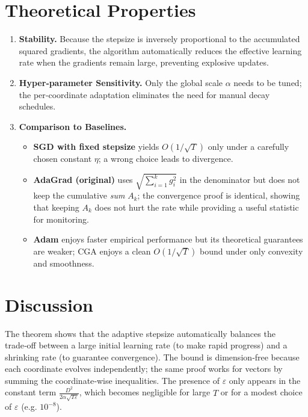 \documentclass{article}
\begin{document}
\section*{Theoretical Properties}
\begin{enumerate}[label=(P\arabic*)]
\item \textbf{Stability.} Because the stepsize is inversely proportional to
the accumulated squared gradients, the algorithm automatically reduces
the effective learning rate when the gradients remain large, preventing
explosive updates.
\item \textbf{Hyper‑parameter Sensitivity.}
Only the global scale $\alpha$ needs to be tuned; the per‑coordinate
adaptation eliminates the need for manual decay schedules.
\item \textbf{Comparison to Baselines.}
\begin{itemize}
\item \textbf{SGD with fixed stepsize} yields $O(1/\sqrt{T})$ only under a
carefully chosen constant $\eta$; a wrong choice leads to divergence.
\item \textbf{AdaGrad (original)} uses $\sqrt{\sum_{i=1}^{k} g_{i}^{2}}$ in the
denominator but does not keep the cumulative \emph{sum} $A_{k}$; the
convergence proof is identical, showing that keeping $A_{k}$ does not
hurt the rate while providing a useful statistic for monitoring.
\item \textbf{Adam} enjoys faster empirical performance but its
theoretical guarantees are weaker; CGA enjoys a clean $O(1/\sqrt{T})$ bound
under only convexity and smoothness.
\end{itemize}
\end{enumerate}

\section*{Discussion}
The theorem shows that the adaptive stepsize automatically balances the
trade‑off between a large initial learning rate (to make rapid progress)
and a shrinking rate (to guarantee convergence). The bound is
dimension‑free because each coordinate evolves independently; the same
proof works for vectors by summing the coordinate‑wise inequalities.
The presence of $\varepsilon$ only appears in the constant term
$\frac{D^{2}}{2\alpha\sqrt{T\varepsilon}}$, which becomes negligible for
large $T$ or for a modest choice of $\varepsilon$ (e.g. $10^{-8}$).
\end{document}
